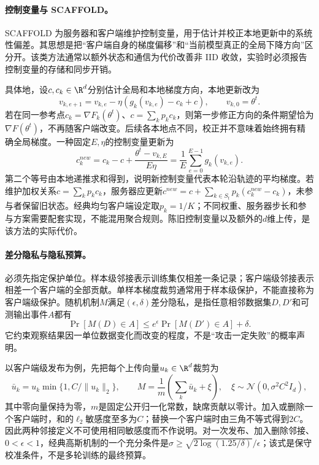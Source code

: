 \paragraph{控制变量与 SCAFFOLD。}
SCAFFOLD 为服务器和客户端维护控制变量，用于估计并校正本地更新中的系统性偏差。其思想是把“客户端自身的梯度偏移”和“当前模型真正的全局下降方向”区分开。该类方法通常以额外状态和通信为代价改善非 IID 收敛，实验时必须报告控制变量的存储和同步开销。

具体地，设$c,c_k\in\R^d$分别估计全局和本地梯度方向，本地更新改为
\begin{equation}
 v_{k,e+1}=v_{k,e}-\eta(g_k(v_{k,e})-c_k+c),
 \qquad v_{k,0}=\theta^t.
\end{equation}
若在同一参考点$c_k=\nabla F_k(\theta^t)$、$c=\sum_kp_kc_k$，则第一步修正方向的条件期望恰为$\nabla F(\theta^t)$，不再随客户端改变。后续各本地点不同，校正并不意味着始终拥有精确全局梯度。一种固定$E,\eta$的控制变量更新为
\begin{equation}
 c_k^{new}=c_k-c+\frac{\theta^t-v_{k,E}}{E\eta}
 =\frac1E\sum_{e=0}^{E-1}g_k(v_{k,e}).
\end{equation}
第二个等号由本地递推求和得到，说明新控制变量代表本轮沿轨迹的平均梯度。若维护加权关系$c=\sum_kp_kc_k$，服务器应更新$c^{new}=c+\sum_{k\in S_t}p_k(c_k^{new}-c_k)$，未参与者保留旧状态。经典均匀客户端设定取$p_k=1/K$；不同权重、服务器步长和参与方案需要配套实现，不能混用聚合规则。陈旧控制变量以及额外的$d$维上传，是该方法的实际代价。

\paragraph{差分隐私与隐私预算。}
必须先指定保护单位。样本级邻接表示训练集仅相差一条记录；客户端级邻接表示相差一个客户端的全部贡献。单样本梯度裁剪通常用于样本级保护，不能直接称为客户端级保护。随机机制$M$满足$(\epsilon,\delta)$差分隐私，是指任意相邻数据集$D,D'$和可测输出事件$A$都有
\begin{equation}
 \Pr[M(D)\in A]\leq e^\epsilon\Pr[M(D')\in A]+\delta.
\end{equation}
它约束观察结果因一单位数据变化而改变的程度，不是“攻击一定失败”的概率声明。

以客户端级发布为例，先把每个上传向量$u_k\in\R^d$裁剪为
\begin{equation}
 \bar u_k=u_k\min\{1,C/\|u_k\|_2\},\qquad
 M=\frac1m\left(\sum_k\bar u_k+\xi\right),\quad
 \xi\sim\mathcal N(0,\sigma^2C^2I_d),
\end{equation}
其中零向量保持为零，$m$是固定公开归一化常数，缺席贡献以零计。加入或删除一个客户端时，和的$\ell_2$敏感度至多为$C$；替换一个客户端时由三角不等式得到$2C$。因此两种邻接定义不可使用相同敏感度而不作说明。对一次发布、加入删除邻接、$0<\epsilon<1$，经典高斯机制的一个充分条件是$\sigma\geq\sqrt{2\log(1.25/\delta)}/\epsilon$；该式是保守校准条件，不是多轮训练的最终预算。

